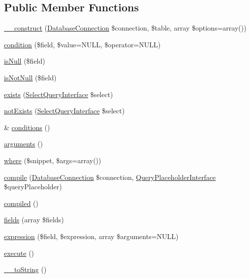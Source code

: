 \subsection*{Public Member Functions}
\begin{DoxyCompactItemize}
\item 
\hyperlink{classUpdateQuery_a55a718df235cde8e96776d9c96d4574e}{\_\-\_\-construct} (\hyperlink{classDatabaseConnection}{DatabaseConnection} \$connection, \$table, array \$options=array())
\item 
\hyperlink{classUpdateQuery_a850350cb972f539accbecf07daec23d2}{condition} (\$field, \$value=NULL, \$operator=NULL)
\item 
\hyperlink{classUpdateQuery_a027756e0adb3f423fd0c19ecbb3ec751}{isNull} (\$field)
\item 
\hyperlink{classUpdateQuery_a703cf7e16e0dd4e78c61e4c6ea948795}{isNotNull} (\$field)
\item 
\hyperlink{classUpdateQuery_a04537fd021194c135a33c2e2f15d8493}{exists} (\hyperlink{interfaceSelectQueryInterface}{SelectQueryInterface} \$select)
\item 
\hyperlink{classUpdateQuery_a0fdac99cf74b86a774f31848d4f98206}{notExists} (\hyperlink{interfaceSelectQueryInterface}{SelectQueryInterface} \$select)
\item 
\& \hyperlink{classUpdateQuery_a3c2a934f164d518ab4aeb5182e770a24}{conditions} ()
\item 
\hyperlink{classUpdateQuery_a2c4a12ea4382257466781f78aa813d06}{arguments} ()
\item 
\hyperlink{classUpdateQuery_a67603f742b3130dd34fd786b69de7ec1}{where} (\$snippet, \$args=array())
\item 
\hyperlink{classUpdateQuery_aea38d2404c542788180cd7fc8867f39d}{compile} (\hyperlink{classDatabaseConnection}{DatabaseConnection} \$connection, \hyperlink{interfaceQueryPlaceholderInterface}{QueryPlaceholderInterface} \$queryPlaceholder)
\item 
\hyperlink{classUpdateQuery_aa094828d0014df9d6893ddc61ea00852}{compiled} ()
\item 
\hyperlink{classUpdateQuery_a5d02f111de8cfe803a352c8ef0f89789}{fields} (array \$fields)
\item 
\hyperlink{classUpdateQuery_a57dc3eee898b5c5ddc21cb70e3978d3f}{expression} (\$field, \$expression, array \$arguments=NULL)
\item 
\hyperlink{classUpdateQuery_a8a90104d1f7aa75cda332b569fd566b9}{execute} ()
\item 
\hyperlink{classUpdateQuery_ac85d757de811a3563119e453e8b356a0}{\_\-\_\-toString} ()
\end{DoxyCompactItemize}
